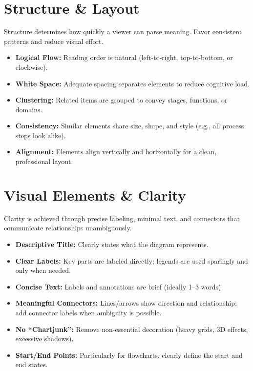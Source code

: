 \documentclass[11pt]{article}
\begin{document}
\section{Structure \& Layout}
Structure determines how quickly a viewer can parse meaning. Favor consistent patterns and reduce visual effort.\cite{ref6,ref7}

\begin{itemize}
  \item \textbf{Logical Flow:} Reading order is natural (left-to-right, top-to-bottom, or clockwise).
  \item \textbf{White Space:} Adequate spacing separates elements to reduce cognitive load.
  \item \textbf{Clustering:} Related items are grouped to convey stages, functions, or domains.
  \item \textbf{Consistency:} Similar elements share size, shape, and style (e.g., all process steps look alike).
  \item \textbf{Alignment:} Elements align vertically and horizontally for a clean, professional layout.\cite{ref6,ref7,ref8,ref9}
\end{itemize}

\section{Visual Elements \& Clarity}
Clarity is achieved through precise labeling, minimal text, and connectors that communicate relationships unambiguously.\cite{ref9,ref12}

\begin{itemize}
  \item \textbf{Descriptive Title:} Clearly states what the diagram represents.
  \item \textbf{Clear Labels:} Key parts are labeled directly; legends are used sparingly and only when needed.
  \item \textbf{Concise Text:} Labels and annotations are brief (ideally 1--3 words).
  \item \textbf{Meaningful Connectors:} Lines/arrows show direction and relationship; add connector labels when ambiguity is possible.
  \item \textbf{No “Chartjunk”:} Remove non-essential decoration (heavy grids, 3D effects, excessive shadows).
  \item \textbf{Start/End Points:} Particularly for flowcharts, clearly define the start and end states.\cite{ref6,ref7,ref9,ref10,ref11,ref12,ref13}
\end{itemize}
\end{document}
